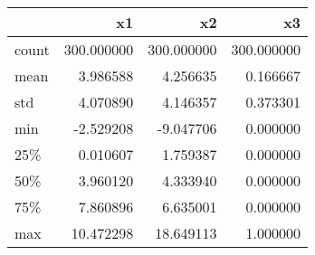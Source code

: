 \begin{tabular}{lrrr}
\toprule
{} &          x1 &          x2 &          x3 \\
\midrule
count &  300.000000 &  300.000000 &  300.000000 \\
mean  &    3.986588 &    4.256635 &    0.166667 \\
std   &    4.070890 &    4.146357 &    0.373301 \\
min   &   -2.529208 &   -9.047706 &    0.000000 \\
25\%   &    0.010607 &    1.759387 &    0.000000 \\
50\%   &    3.960120 &    4.333940 &    0.000000 \\
75\%   &    7.860896 &    6.635001 &    0.000000 \\
max   &   10.472298 &   18.649113 &    1.000000 \\
\bottomrule
\end{tabular}
